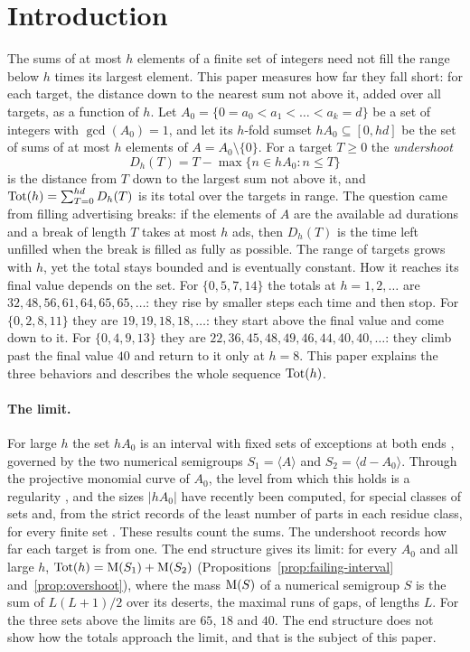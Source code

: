 \section{Introduction}\label{sec:intro}

The sums of at most $h$ elements of a finite set of integers need not fill the range below $h$ times its largest element. This paper measures how far they fall short: for each target, the distance down to the nearest sum not above it, added over all targets, as a function of $h$. Let $A_0=\{0=a_0<a_1<\dots<a_k=d\}$ be a set of integers with $\gcd(A_0)=1$, and let its $h$-fold sumset $hA_0\subseteq[0,hd]$ be the set of sums of at most $h$ elements of $A=A_0\setminus\{0\}$. For a target $T\ge0$ the \emph{undershoot}
\[
D_h(T)=T-\max\{n\in hA_0:n\le T\}
\]
is the distance from $T$ down to the largest sum not above it, and $\operatorname{Tot}(h)=\sum_{T=0}^{hd}D_h(T)$ is its total over the targets in range. The question came from filling advertising breaks: if the elements of $A$ are the available ad durations and a break of length $T$ takes at most $h$ ads, then $D_h(T)$ is the time left unfilled when the break is filled as fully as possible. The range of targets grows with $h$, yet the total stays bounded and is eventually constant. How it reaches its final value depends on the set. For $\{0,5,7,14\}$ the totals at $h=1,2,\dots$ are $32,48,56,61,64,65,65,\dots$: they rise by smaller steps each time and then stop. For $\{0,2,8,11\}$ they are $19,19,18,18,\dots$: they start above the final value and come down to it. For $\{0,4,9,13\}$ they are $22,36,45,48,49,46,44,40,40,\dots$: they climb past the final value $40$ and return to it only at $h=8$. This paper explains the three behaviors and describes the whole sequence $\operatorname{Tot}(h)$.

\paragraph{The limit.} For large $h$ the set $hA_0$ is an interval with fixed sets of exceptions at both ends \cite{Nathanson1972,GranvilleShakan2020,GranvilleWalker2021,Lev2022}, governed by the two numerical semigroups $S_1=\langle A\rangle$ and $S_2=\langle d-A_0\rangle$. Through the projective monomial curve of $A_0$, the level from which this holds is a regularity \cite{Elias2022,GimenezGonzalezSanchez2023}, and the sizes $|hA_0|$ have recently been computed, for special classes of sets \cite{Nathanson2025} and, from the strict records of the least number of parts in each residue class, for every finite set \cite[Thm.~1]{ChenYang2026}. These results count the sums. The undershoot records how far each target is from one. The end structure gives its limit: for every $A_0$ and all large $h$, $\operatorname{Tot}(h)=\operatorname{M}(S_1)+\operatorname{M}(S_2)$ (Propositions~\ref{prop:failing-interval} and~\ref{prop:overshoot}), where the mass $\operatorname{M}(S)$ of a numerical semigroup $S$ is the sum of $L(L+1)/2$ over its deserts, the maximal runs of gaps, of lengths $L$. For the three sets above the limits are $65$, $18$ and $40$. The end structure does not show how the totals approach the limit, and that is the subject of this paper.

